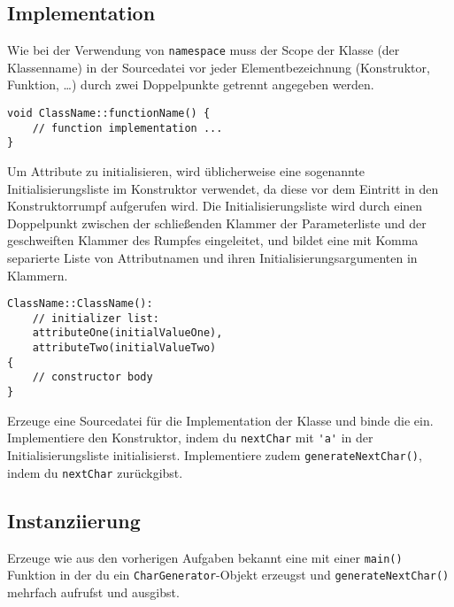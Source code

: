 \subsection{Implementation}
Wie bei der Verwendung von \lstinline{namespace} muss der Scope der Klasse (der Klassenname) in der Sourcedatei vor jeder Elementbezeichnung (Konstruktor, Funktion, \dots) durch zwei Doppelpunkte getrennt angegeben werden.

\begin{lstlisting}
void ClassName::functionName() {
	// function implementation ...
}
\end{lstlisting}

Um Attribute zu initialisieren, wird üblicherweise eine sogenannte Initialisierungsliste im Konstruktor verwendet, da diese vor dem Eintritt in den Konstruktorrumpf aufgerufen wird.
Die Initialisierungsliste wird durch einen Doppelpunkt zwischen der schließenden Klammer der Parameterliste und der geschweiften Klammer des Rumpfes eingeleitet, und bildet eine mit Komma separierte Liste von Attributnamen und ihren Initialisierungsargumenten in Klammern.

\begin{lstlisting}
ClassName::ClassName():
	// initializer list:
	attributeOne(initialValueOne),
	attributeTwo(initialValueTwo)
{
	// constructor body
}
\end{lstlisting}

Erzeuge eine Sourcedatei  für die Implementation der Klasse und binde die  ein.
Implementiere den Konstruktor, indem du \lstinline{nextChar} mit \lstinline{'a'} in der Initialisierungsliste initialisierst.
Implementiere zudem \lstinline{generateNextChar()}, indem du \lstinline{nextChar} zurückgibst.


\subsection{Instanziierung}
Erzeuge wie aus den vorherigen Aufgaben bekannt eine  mit einer \lstinline{main()} Funktion in der du ein \lstinline{CharGenerator}-Objekt erzeugst und \lstinline{generateNextChar()} mehrfach aufrufst und ausgibst.

